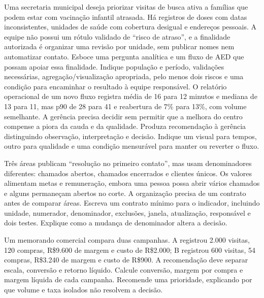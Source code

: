 \TextoBase Uma secretaria municipal deseja priorizar visitas de busca ativa a famílias que podem estar com vacinação infantil atrasada. Há registros de doses com datas inconsistentes, unidades de saúde com cobertura desigual e endereços pessoais. A equipe não possui um rótulo validado de ``risco de atraso'', e a finalidade autorizada é organizar uma revisão por unidade, sem publicar nomes nem automatizar contato.
\FonteDidatica
\Comando Esboce uma pergunta analítica e um fluxo de AED que possam apoiar essa finalidade. Indique população e período, validações necessárias, agregação/visualização apropriada, pelo menos dois riscos e uma condição para encaminhar o resultado à equipe responsável.
\TextoBase O relatório operacional de um novo fluxo registra média de 16 para 12 minutos e mediana de 13 para 11, mas p90 de 28 para 41 e reabertura de 7\% para 13\%, com volume semelhante. A gerência precisa decidir sem permitir que a melhora do centro compense a piora da cauda e da qualidade.
\FonteDidatica
\Comando Produza recomendação à gerência distinguindo observação, interpretação e decisão. Indique um visual para tempos, outro para qualidade e uma condição mensurável para manter ou reverter o fluxo.

\TextoBase Três áreas publicam ``resolução no primeiro contato'', mas usam denominadores diferentes: chamados abertos, chamados encerrados e clientes únicos. Os valores alimentam metas e remuneração, embora uma pessoa possa abrir vários chamados e alguns permaneçam abertos no corte. A organização precisa de um contrato antes de comparar áreas.
\FonteDidatica
\Comando Escreva um contrato mínimo para o indicador, incluindo unidade, numerador, denominador, exclusões, janela, atualização, responsável e dois testes. Explique como a mudança de denominador altera a decisão.

\TextoBase Um memorando comercial compara duas campanhas. A registrou 2.000 visitas, 120 compras, R\$9.600 de margem e custo de R\$2.000; B registrou 600 visitas, 54 compras, R\$3.240 de margem e custo de R\$900. A recomendação deve separar escala, conversão e retorno líquido.
\FonteDidatica
\Comando Calcule conversão, margem por compra e margem líquida de cada campanha. Recomende uma prioridade, explicando por que volume e taxa isolados não resolvem a decisão.

